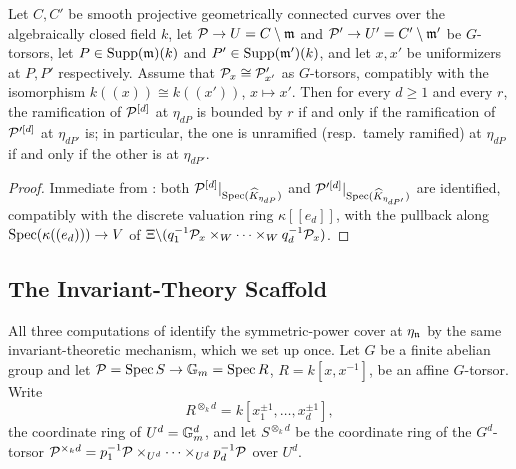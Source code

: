 \begin{cor}[Reduction to $\bP^1$]\label{cor:reduction_to_P1}
    Let $C, C'$ be smooth projective geometrically connected curves over the algebraically closed field $k$, let
    $\mathcal{P} \to U = C \setminus \mathfrak{m}$ and $\mathcal{P}' \to U' = C' \setminus \mathfrak{m}'$ be $G$-torsors, let
    $P \in \mathrm{Supp}(\mathfrak{m})(k)$ and $P' \in \mathrm{Supp}(\mathfrak{m}')(k)$, and let $x, x'$ be uniformizers at $P, P'$
    respectively. Assume that $\mathcal{P}_x \cong \mathcal{P}'_{x'}$ as $G$-torsors, compatibly with the isomorphism
    $k((x)) \cong k((x'))$, $x \mapsto x'$.
    Then for every $d \geq 1$ and every $r$, the ramification of $\mathcal{P}^{[d]}$ at $\eta_{dP}$ is bounded by $r$ if and only if
    the ramification of $\mathcal{P}'^{[d]}$ at $\eta_{dP'}$ is; in particular, the one is unramified (resp.\ tamely ramified) at
    $\eta_{dP}$ if and only if the other is at $\eta_{dP'}$.
\end{cor}
\begin{proof}
    Immediate from : both $\mathcal{P}^{[d]}|_{\operatorname{Spec}(\widehat{K}_{\eta_{dP}})}$ and
    $\mathcal{P}'^{[d]}|_{\operatorname{Spec}(\widehat{K}_{\eta_{dP'}})}$ are identified, compatibly with the discrete valuation ring
    $\kappa[[e_d]]$, with the pullback along $\operatorname{Spec}(\kappa((e_d))) \to V$ of
    $\Xi \backslash (q_1^{-1}\mathcal{P}_x \times_W \cdots \times_W q_d^{-1}\mathcal{P}_x)$.
\end{proof}

\subsection*{The Invariant-Theory Scaffold}

All three computations of  identify
the symmetric-power cover at $\eta_{\mathfrak{n}}$ by the same invariant-theoretic
mechanism, which we set up once. Let $G$ be a finite abelian group and let
$\mathcal{P} = \operatorname{Spec} S \to \mathbb{G}_m = \operatorname{Spec} R$, $R = k[x, x^{-1}]$, be an affine
$G$-torsor. Write
\[
    R^{\otimes_k d} = k[x_1^{\pm 1}, \dots, x_d^{\pm 1}],
\]
the coordinate ring of $U^d = \mathbb{G}_m^d$, and let
$S^{\otimes_k d}$ be the coordinate ring of the $G^d$-torsor
$\mathcal{P}^{\times_k d} = p_1^{-1}\mathcal{P} \times_{U^d} \cdots \times_{U^d} p_d^{-1}\mathcal{P}$
over $U^d$.

